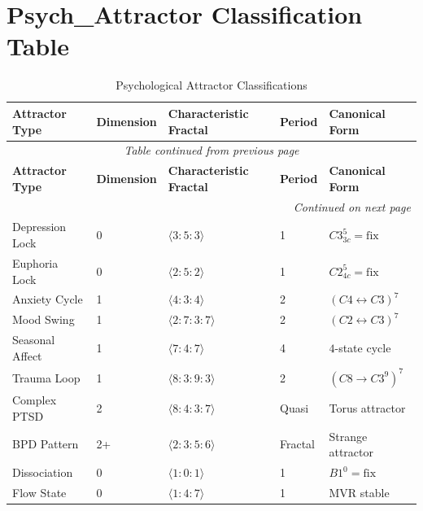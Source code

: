 \documentclass[11pt,twoside]{book}
\renewcommand{\arraystretch}{1.2}  %
\newcommand{\fix}{\mathrm{fix}}
\begin{document}
\section{Psych\_Attractor Classification Table}

\begin{center}
\small
\renewcommand{\arraystretch}{1.3}
\begin{longtable}{p{1.8cm}|p{1.5cm}|p{2cm}|p{1.5cm}|p{3cm}}
\caption{Psychological Attractor Classifications} \\
\toprule
\textbf{Attractor Type} & \textbf{Dimension} & \textbf{Characteristic Fractal} & \textbf{Period} & \textbf{Canonical Form} \\
\midrule
\endfirsthead
\multicolumn{5}{c}{\textit{Table continued from previous page}} \\
\toprule
\textbf{Attractor Type} & \textbf{Dimension} & \textbf{Characteristic Fractal} & \textbf{Period} & \textbf{Canonical Form} \\
\midrule
\endhead
\midrule
\multicolumn{5}{r}{\textit{Continued on next page}} \\
\endfoot
\bottomrule
\endlastfoot
Depression Lock & 0 & $\langle 3:5:3 \rangle$ & 1 & $C3^5_{3c} = \fix$ \\
Euphoria Lock & 0 & $\langle 2:5:2 \rangle$ & 1 & $C2^5_{4c} = \fix$ \\
Anxiety Cycle & 1 & $\langle 4:3:4 \rangle$ & 2 & $(C4 \leftrightarrow C3)^7$ \\
Mood Swing & 1 & $\langle 2:7:3:7 \rangle$ & 2 & $(C2 \leftrightarrow C3)^7$ \\
Seasonal Affect & 1 & $\langle 7:4:7 \rangle$ & 4 & $4$-state cycle \\
Trauma Loop & 1 & $\langle 8:3:9:3 \rangle$ & 2 & $(C8 \to C3^9)^7$ \\
Complex PTSD & 2 & $\langle 8:4:3:7 \rangle$ & Quasi & Torus attractor \\
BPD Pattern & 2+ & $\langle 2:3:5:6 \rangle$ & Fractal & Strange attractor \\
Dissociation & 0 & $\langle 1:0:1 \rangle$ & 1 & $B1^0 = \fix$ \\
Flow State & 0 & $\langle 1:4:7 \rangle$ & 1 & MVR stable \\
\end{longtable}
\end{center}

\end{document}
